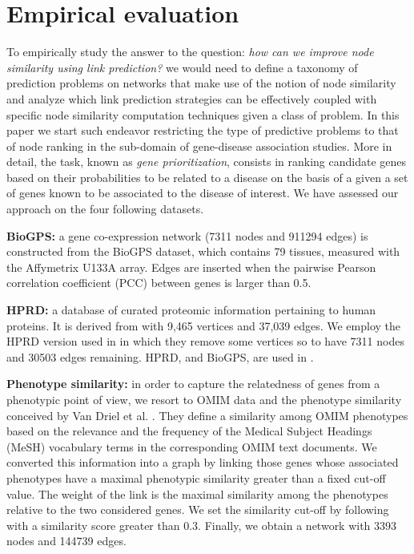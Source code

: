 
\section{Empirical evaluation} \label{evaluation} 

To empirically study the answer to the question: {\em how can we improve node
similarity using link prediction?} we would need to define a taxonomy of
prediction problems on networks that make use of the notion of node similarity
and analyze which link prediction strategies can be effectively coupled with
specific node similarity computation techniques given a class of problem. In
this paper we start such endeavor restricting the type of predictive problems
to that of node ranking in the sub-domain of gene-disease association studies.
More in detail, the task, known as {\em gene prioritization}, consists in
ranking candidate genes based on their probabilities to be related to a
disease on the basis of a given a set of genes known to be associated to the
disease of interest. 
We have assessed our approach on the four following datasets.

\textbf{BioGPS:} a gene co-expression network (7311 nodes and 911294 edges) is
constructed from the BioGPS dataset, which contains 79 tissues, measured with
the Affymetrix U133A array. Edges are inserted when the pairwise Pearson
correlation coefficient (PCC) between genes is larger than 0.5.

\textbf{HPRD:} a database of curated proteomic information pertaining to
human proteins. It is derived from \cite{jour5} with 9,465 vertices and 37,039
edges. We employ the HPRD version used in \cite{jour6} in which they remove
some vertices so to have 7311 nodes and 30503 edges remaining. HPRD, and
BioGPS, are used in \cite{proceeding3}.

\textbf{Phenotype similarity:} in order to capture the relatedness of genes
from a phenotypic point of view, we resort to OMIM \cite{jour4} data and the
phenotype similarity conceived by Van Driel et al. \cite{jour5}. They define a
similarity among OMIM phenotypes based on the relevance and the frequency of
the Medical Subject Headings (MeSH) vocabulary terms in the corresponding OMIM
text documents. We converted this information into a graph by linking those
genes whose associated phenotypes have a maximal phenotypic similarity greater
than a fixed cut-off value. The weight of the link is the maximal similarity
among the phenotypes relative to the two considered genes. We set the
similarity cut-off by following \cite{jour5} with a similarity score greater
than $0.3$. Finally, we obtain a network with 3393 nodes and 144739 edges.

